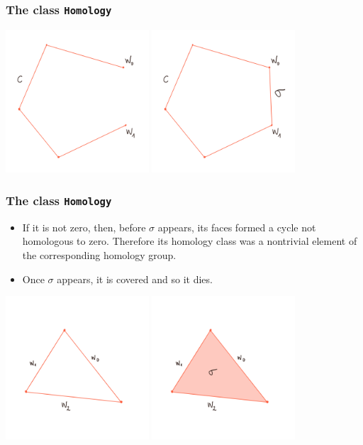 \documentclass[xcolor=dvipsnames]{beamer}
\begin{document}
\begin{frame}
	\frametitle{The class \texttt{Homology}}
	\centering
	\includegraphics[width = 0.4\textwidth]{beamer/close-1}
	\hfill
	\pause
	\includegraphics[width = 0.4\textwidth]{beamer/close-2}
\end{frame}

\begin{frame}
	\frametitle{The class \texttt{Homology}}
	\begin{itemize}
		\item If it is not zero, then, before \( \sigma \) appears, its faces formed a cycle
			not homologous to zero. Therefore its homology class was a nontrivial element of the
			corresponding homology group. \pause
		\item Once \( \sigma \) appears, it is covered and so it dies. \pause
	\end{itemize}

	\centering
	\includegraphics[width = 0.4\textwidth]{beamer/cover-1}
	\hfill
	\pause
	\includegraphics[width = 0.4\textwidth]{beamer/cover-2}
\end{frame}
\end{document}
